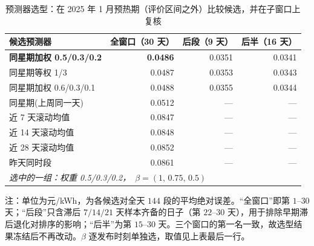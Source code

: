 \begin{table}[htbp]
  \centering
  \caption{预测器选型：在 2025 年 1 月预热期（评价区间之外）比较候选，并在子窗口上复核}
  \label{tab:p4-select}
  \footnotesize
  \begin{tabular}{lrrr}
    \toprule
    候选预测器 & 全窗口（30 天） & 后段（9 天） & 后半（16 天） \\
    \midrule
    \textbf{同星期加权 0.5/0.3/0.2} & \textbf{0.0486} & 0.0351 & 0.0341 \\
    同星期等权 1/3 & 0.0487 & 0.0353 & 0.0343 \\
    同星期加权 0.6/0.3/0.1 & 0.0488 & 0.0355 & 0.0344 \\
    同星期(上周同一天) & 0.0512 & --- & --- \\
    近 7 天滚动均值 & 0.0847 & --- & --- \\
    近 14 天滚动均值 & 0.0848 & --- & --- \\
    近 28 天滚动均值 & 0.0852 & --- & --- \\
    昨天同时段 & 0.0861 & --- & --- \\
    \midrule
    \multicolumn{4}{l}{\textit{选中的一组：权重 0.5/0.3/0.2，}\ $\beta=(1,\,0.75,\,0.5)$} \\
    \bottomrule
  \end{tabular}
  \par\vspace{2pt}
  \begin{minipage}{.95\textwidth}\footnotesize
    注：单位为元/kWh，为各候选对全天 $144$ 段的平均绝对误差。``全窗口''即第 $1$--$30$ 天；``后段''只含滞后 $7/14/21$ 天样本齐备的日子（第 $22$--$30$ 天），用于排除早期滞后退化对排序的影响；``后半''为第 $15$--$30$ 天。三个窗口的第一名一致，故选型结果冻结后不再改动。$\beta$ 逐发布时刻单独选，取值见上表最后一行。
  \end{minipage}
\end{table}

